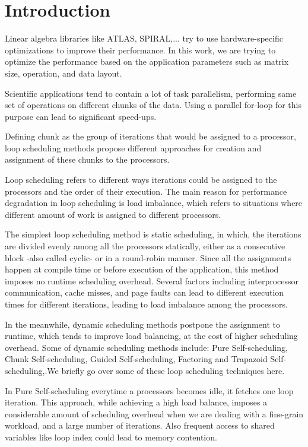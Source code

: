 \section{Introduction}

Linear algebra libraries like ATLAS, SPIRAL,... try to use hardware-specific optimizations to improve their performance. In this work, we are trying to optimize the performance based on the application parameters such as matrix size, operation, and data layout.   

Scientific applications tend to contain a lot of task parallelism, performing same set of operations on different chunks of the data. Using a parallel for-loop for this purpose can lead to significant speed-ups.

Defining chunk as the group of iterations that would be assigned to a
processor, loop scheduling methods propose different approaches for creation and assignment of these chunks to the processors.


Loop scheduling refers to different ways iterations could be assigned to the processors and the order of their execution. 
The main reason for performance degradation in loop scheduling is load imbalance, which refers to situations where different amount of work is assigned to different processors\cite{ciorba2018openmp}.    

The simplest loop scheduling method is static scheduling, in which, the iterations are divided evenly among all the processors statically, either as a consecutive block -also called cyclic- or in a round-robin manner\cite{liu1994safe}. Since all the assignments happen at compile time or before execution of the application, this method imposes no runtime scheduling overhead. Several factors including interprocessor communication, cache misses, and page faults can lead to different execution times for different iterations, leading to load imbalance among the processors\cite{philip1995increasing}.

In the meanwhile, dynamic scheduling methods postpone the assignment to runtime, which tends to improve load balancing, at the cost of higher scheduling overhead. Some of dynamic scheduling methods include: Pure Self-scheduling, Chunk Self-scheduling, Guided Self-scheduling\cite{polychronopoulos1987guided}, Factoring\cite{hummel1992factoring} and Trapazoid Self-scheduling\cite{tzen1993trapezoid},\cite{liu1994safe}.We briefly go over some of these loop scheduling techniques here.


In Pure Self-scheduling everytime a processors becomes idle, it fetches one loop iteration. This approach, while achieving a high load balance, imposes a considerable amount of scheduling overhead when we are dealing with a fine-grain workload, and a large number of iterations. Also frequent access to shared variables like loop index could lead to memory contention\cite{liu1994safe}. 

